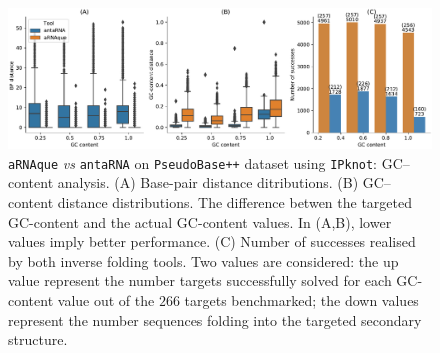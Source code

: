 \begin{figure}[t!]
	\includegraphics[width=1.0\linewidth]{../res/images/arnaque/fig6.pdf}
	\caption{\texttt{aRNAque} \emph{vs} \texttt{antaRNA} on \texttt{PseudoBase++} dataset using \texttt{IPknot}: GC--content analysis. (A) Base-pair distance ditributions. (B) GC--content distance distributions. The difference betwen the targeted GC-content and the actual GC-content values. In (A,B), lower values imply better performance. (C) Number of successes realised by both inverse folding tools. Two values are considered: the up value represent the number targets successfully solved for each GC-content value out of the $266$ targets benchmarked; the down values represent the number sequences folding into the targeted secondary structure.}\label{Fig:GC_content}
\end{figure}
